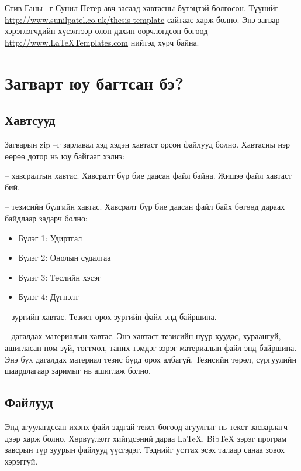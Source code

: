 Стив Ганы  --г Сунил Петер авч засаад хавтасны бүтэцтэй болгосон. Түүнийг \url{http://www.sunilpatel.co.uk/thesis-template} сайтаас харж болно. Энэ загвар хэрэглэгчдийн хүсэлтээр олон дахин өөрчлөгдсөн бөгөөд \url{http://www.LaTeXTemplates.com} нийтэд хүрч байна.


\section{Загварт юу багтсан бэ?}

\subsection{Хавтсууд}

Загварын zip --г зарлавал хэд хэдэн хавтаст орсон файлууд болно. Хавтасны нэр өөрөө дотор нь юу байгааг хэлнэ:

 -- хавсралтын хавтас. Хавсралт бүр бие даасан  файл байна. Жишээ файл хавтаст бий.

 -- тезисийн бүлгийн хавтас. Хавсралт бүр бие даасан  файл байх бөгөөд дараах байдлаар задарч болно:
\begin{itemize}
\item Бүлэг 1: Удиртгал
\item Бүлэг 2: Онолын судалгаа
\item Бүлэг 3: Төслийн хэсэг
\item Бүлэг 4: Дүгнэлт
\end{itemize}

 -- зургийн хавтас. Тезист орох зургийн файл энд байршина.

 -- дагалдах материалын хавтас. Энэ хавтаст тезисийн нүүр хуудас, хураангуй, ашигласан ном зүй, тогтмол, таних тэмдэг зэрэг материалын файл энд байршина. Энэ бүх дагалдах материал тезис бүрд орох албагүй. Тезисийн төрөл, сургуулийн шаардлагаар заримыг нь ашиглаж болно. 

\subsection{Файлууд}

Энд агуулагдссан ихэнх файл задгай текст бөгөөд агуулгыг нь текст засварлагч дээр харж болно. Хөрвүүлэлт хийгдсэний дараа \LaTeX{}, BibTeX зэрэг програм завсрын түр зуурын файлууд үүсгэдэг. Тэднийг устгах эсэх талаар санаа зовох хэрэггүй.


